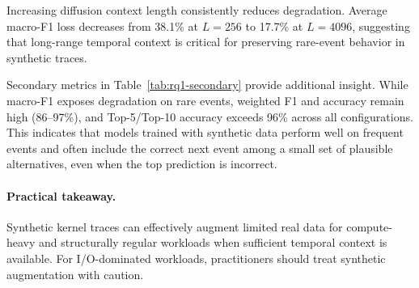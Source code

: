 Increasing diffusion context length consistently reduces degradation. Average macro-F1 loss decreases from 38.1\% at $L=256$ to 17.7\% at $L=4096$, suggesting that long-range temporal context is critical for preserving rare-event behavior in synthetic traces.

Secondary metrics in Table~\ref{tab:rq1-secondary} provide additional insight. While macro-F1 exposes degradation on rare events, weighted F1 and accuracy remain high (86--97\%), and Top-5/Top-10 accuracy exceeds 96\% across all configurations. This indicates that models trained with synthetic data perform well on frequent events and often include the correct next event among a small set of plausible alternatives, even when the top prediction is incorrect.

\paragraph{Practical takeaway.}
Synthetic kernel traces can effectively augment limited real data for compute-heavy and structurally regular workloads when sufficient temporal context is available. For I/O-dominated workloads, practitioners should treat synthetic augmentation with caution.


